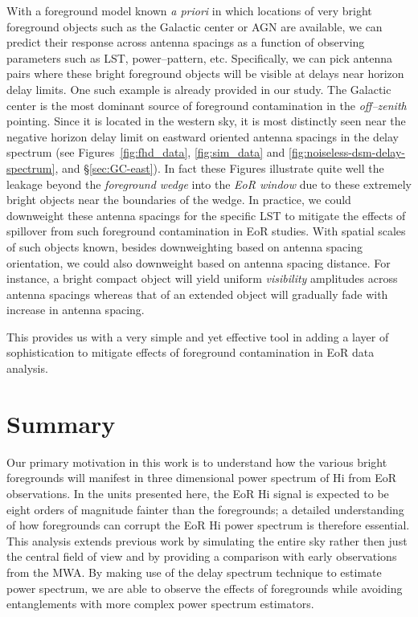\documentclass[preprint2,iop,numberedappendix]{emulateapj}
\begin{document}
With a foreground model known {\it a priori} in which locations of very bright foreground objects such as the Galactic center or AGN are available, we can predict their response across antenna spacings as a function of observing parameters such as LST, power--pattern, etc. Specifically, we can pick antenna pairs where these bright foreground objects will be visible at delays near horizon delay limits. One such example is already provided in our study. The Galactic center is the most dominant source of foreground contamination in the {\it off--zenith} pointing. Since it is located in the western sky, it is most distinctly seen near the negative horizon delay limit on eastward oriented antenna spacings in the delay spectrum (see Figures~\ref{fig:fhd_data}, \ref{fig:sim_data} and \ref{fig:noiseless-dsm-delay-spectrum}, and \S\ref{sec:GC-east}). In fact these Figures illustrate quite well the leakage beyond the {\it foreground wedge} into the {\it EoR window} due to these extremely bright objects near the boundaries of the wedge. In practice, we could downweight these antenna spacings for the specific LST to mitigate the effects of spillover from such foreground contamination in EoR studies. With spatial scales of such objects known, besides downweighting based on antenna spacing orientation, we could also downweight based on antenna spacing distance. For instance, a bright compact object will yield uniform {\it visibility} amplitudes across antenna spacings whereas that of an extended object will gradually fade with increase in antenna spacing. 

This provides us with a very simple and yet effective tool in adding a layer of sophistication to mitigate effects of foreground contamination in EoR data analysis. %

\section{Summary}\label{sec:summary}

Our primary motivation in this work is to understand how the various bright foregrounds will manifest in three dimensional power spectrum of H{\sc i} from EoR observations. In the units presented here, the EoR H{\sc i} signal is expected to be eight orders of magnitude fainter than the foregrounds; a detailed understanding of how foregrounds can corrupt the EoR H{\sc i} power spectrum is therefore essential. This analysis extends previous work by simulating the entire sky rather then just the central field of view and by providing a comparison with early observations from the MWA. By making use of the delay spectrum technique to estimate power spectrum, we are able to observe the effects of foregrounds while avoiding entanglements with more complex power spectrum estimators.  
\end{document}
